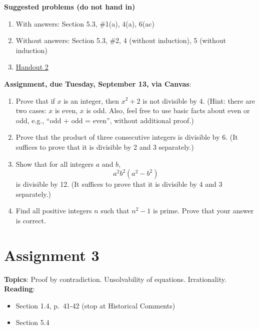 \documentclass[12pt]{article}
\begin{document}
\noindent \textbf{Suggested problems (do not hand in)}

\begin{enumerate}
\item With answers: Section 5.3, \#1(a), 4(a), 6(ac)

\item Without answers: Section 5.3, \#2, 4 (without induction), 5 (without induction)

\item \href{https://www.math.emory.edu/~dzb/teaching/250Fall2021/handouts/250-H02-divisibility.pdf}{Handout 2}
\end{enumerate}


\noindent \textbf{Assignment, due Tuesday, September 13, via Canvas}:

\begin{enumerate}
\item Prove that if $x$ is an integer, then $x^2 + 2$ is not divisible by 4. (Hint: there are two cases: $x$ is even, $x$ is odd. Also, feel free to use basic facts about even or odd, e.g., ``odd + odd = even'', without additional proof.)
\item Prove that the product of three consecutive integers is divisible by 6. (It suffices to prove that it is divisible by 2 and 3 separately.)
\item Show that for all integers $a$ and $b$, 
\[
a^2b^2(a^2 - b^2)
\]
is divisible by 12. (It suffices to prove that it is divisible by 4 and 3 separately.)
\item Find all positive integers $n$ such that $n^2 - 1$ is prime. Prove that your answer is correct.

\end{enumerate}


\newpage
\section[3 (due September 20): Proof by contradiction. Unsolvability. Irrationality.]{Assignment 3}

\textbf{Topics}: Proof by contradiction. Unsolvability of equations. Irrationality.
\\

\noindent \textbf{Reading}:
\begin{itemize}
\item Section 1.4, p.~41-42 (stop at Historical Comments)
\item Section 5.4
\end{itemize}
\end{document}
